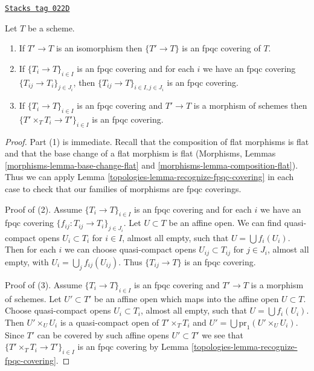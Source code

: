 \begin{lemma}[Fpqc]
\label{topologies-lemma-fpqc}
\href{https://stacks.math.columbia.edu/tag/022D}{\texttt{Stacks tag 022D}}

Let $T$ be a scheme.
\begin{enumerate}
\item If $T' \to T$ is an isomorphism then $\{T' \to T\}$
is an fpqc covering of $T$.
\item If $\{T_i \to T\}_{i\in I}$ is an fpqc covering and for each
$i$ we have an fpqc covering $\{T_{ij} \to T_i\}_{j\in J_i}$, then
$\{T_{ij} \to T\}_{i \in I, j\in J_i}$ is an fpqc covering.
\item If $\{T_i \to T\}_{i\in I}$ is an fpqc covering
and $T' \to T$ is a morphism of schemes then
$\{T' \times_T T_i \to T'\}_{i\in I}$ is an fpqc covering.
\end{enumerate}
\end{lemma}

\begin{proof}

Part (1) is immediate. Recall that the composition of flat morphisms
is flat and that the base change of a flat morphism is flat
(Morphisms, Lemmas \ref{morphisms-lemma-base-change-flat} and
\ref{morphisms-lemma-composition-flat}).
Thus we can apply Lemma \ref{topologies-lemma-recognize-fpqc-covering}
in each case to check that our families of morphisms are fpqc coverings.

\medskip\noindent
Proof of (2). Assume $\{T_i \to T\}_{i\in I}$ is an fpqc covering and for each
$i$ we have an fpqc covering $\{f_{ij} : T_{ij} \to T_i\}_{j\in J_i}$.
Let $U \subset T$ be an affine open. We can find
quasi-compact opens $U_i \subset T_i$ for $i \in I$, almost all empty,
such that $U = \bigcup f_i(U_i)$. Then for each $i$ we can choose
quasi-compact opens $U_{ij} \subset T_{ij}$ for $j \in J_i$, almost all empty,
with $U_i = \bigcup_j f_{ij}(U_{ij})$. Thus
$\{T_{ij} \to T\}$ is an fpqc covering.

\medskip\noindent
Proof of (3). Assume $\{T_i \to T\}_{i\in I}$ is an fpqc covering
and $T' \to T$ is a morphism of schemes. Let $U' \subset T'$ be an affine
open which maps into the affine open $U \subset T$. Choose
quasi-compact opens $U_i \subset T_i$, almost all empty,
such that $U = \bigcup f_i(U_i)$. Then $U' \times_U U_i$ is
a quasi-compact open of $T' \times_T T_i$ and
$U' = \bigcup \text{pr}_1(U' \times_U U_i)$. Since $T'$
can be covered by such affine opens $U' \subset T'$ we see
that $\{T' \times_T T_i \to T'\}_{i\in I}$ is an fpqc covering by
Lemma \ref{topologies-lemma-recognize-fpqc-covering}.
\end{proof}

